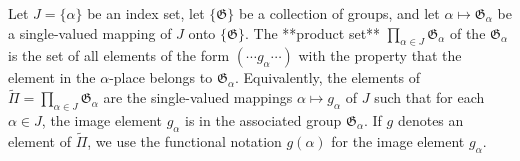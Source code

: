 Let $J = \{\alpha\}$ be an index set, let $\{\mathfrak{G}\}$ be a collection of groups, and let $\alpha \mapsto \mathfrak{G}_{\alpha}$ be a single-valued mapping of $J$ onto $\{\mathfrak{G}\}$. The **product set** $\prod_{\alpha \in J} \mathfrak{G}_{\alpha}$ of the $\mathfrak{G}_{\alpha}$ is the set of all elements of the form $(\cdots g_{\alpha} \cdots)$ with the property that the element in the $\alpha$-place belongs to $\mathfrak{G}_{\alpha}$. Equivalently, the elements of $\tilde{\Pi} = \prod_{\alpha \in J} \mathfrak{G}_{\alpha}$ are the single-valued mappings $\alpha \mapsto g_{\alpha}$ of $J$ such that for each $\alpha \in J$, the image element $g_{\alpha}$ is in the associated group $\mathfrak{G}_{\alpha}$. If $g$ denotes an element of $\tilde{\Pi}$, we use the functional notation $g(\alpha)$ for the image element $g_{\alpha}$.
